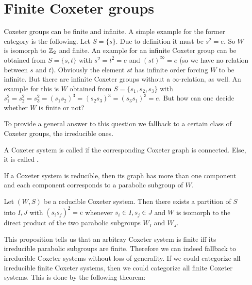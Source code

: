 \section{Finite Coxeter groups}
\label{sec:coxeter-groups-finite}

Coxeter groups can be finite and infinite. A simple example for the former category is the following. Let $S = \{ s \}$. Due to definition it must be $s^2 = e$. So $W$ is isomorph to $\mathbb{Z}_2$ and finite. An example for an infinite Coxeter group can be obtained from $S = \{s,t\}$ with $s^2=t^2=e$ and $(st)^\infty = e$ (so we have no relation between $s$ and $t$). Obviously the element $st$ has infinite order forcing $W$ to be infinite. But there are infinite Coxeter groups without a $\infty$-relation, as well. An example for this is $W$ obtained from $S=\{s_1,s_2,s_3\}$ with $s_1^2=s_2^2=s_3^2=(s_1 s_2)^3=(s_2 s_3)^3=(s_3 s_1)^3=e$. But how can one decide whether $W$ is finite or not?

To provide a general answer to this question we fallback to a certain class of Coxeter groups, the irreducible ones.

\begin{defi}
	A Coxeter system is called  if the corresponding Coxeter graph is connected. Else, it is called .
\end{defi}

If a Coxeter system is reducible, then its graph has more than one component and each component corresponds to a parabolic subgroup of $W$. 

\begin{prop}
	Let $(W,S)$ be a reducible Coxeter system. Then there exists a partition of $S$ into $I,J$ with $(s_i s_j)^2 = e$ whenever $s_i \in I, s_j \in J$ and $W$ is isomorph to the direct product of the two parabolic subgroups $W_I$ and $W_J$.
\end{prop}

This proposition tells us that an arbitray Coxeter system is finite iff its irreducible parabolic subgroups are finite. Therefore we can indeed fallback to irreducible Coxeter systems without loss of generality. If we could categorize all irreducible finite Coxeter systems, then we could categorize all finite Coxeter systems. This is done by the following theorem:

